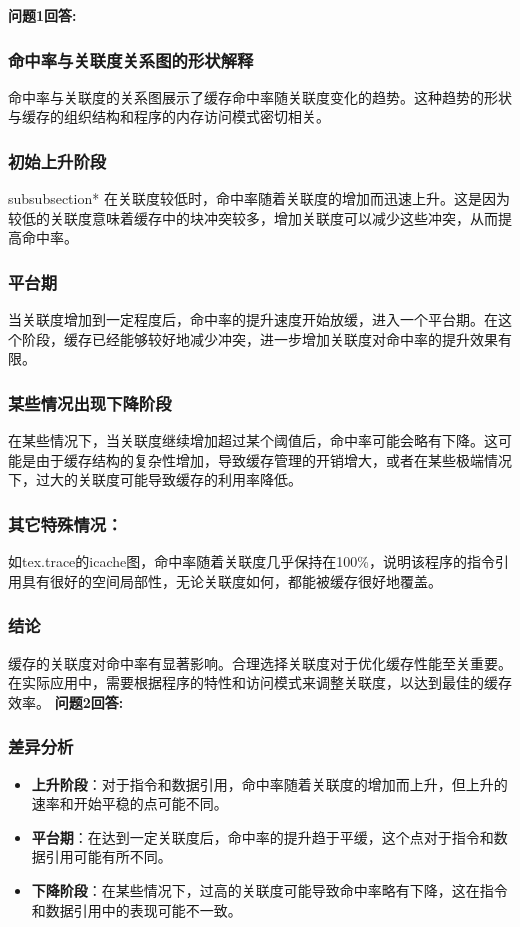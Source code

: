\documentclass[12pt,hyperref,a4paper,UTF8]{ctexart}
\begin{document}
\textbf{问题1回答:}



\subsubsection*{命中率与关联度关系图的形状解释}
命中率与关联度的关系图展示了缓存命中率随关联度变化的趋势。这种趋势的形状与缓存的组织结构和程序的内存访问模式密切相关。

\subsubsection*{初始上升阶段}subsubsection*
在关联度较低时，命中率随着关联度的增加而迅速上升。这是因为较低的关联度意味着缓存中的块冲突较多，增加关联度可以减少这些冲突，从而提高命中率。

\subsubsection*{平台期}
当关联度增加到一定程度后，命中率的提升速度开始放缓，进入一个平台期。在这个阶段，缓存已经能够较好地减少冲突，进一步增加关联度对命中率的提升效果有限。

\subsubsection*{某些情况出现下降阶段}
在某些情况下，当关联度继续增加超过某个阈值后，命中率可能会略有下降。这可能是由于缓存结构的复杂性增加，导致缓存管理的开销增大，或者在某些极端情况下，过大的关联度可能导致缓存的利用率降低。

\subsubsection*{其它特殊情况：}
如tex.trace的icache图，命中率随着关联度几乎保持在100\%，说明该程序的指令引用具有很好的空间局部性，无论关联度如何，都能被缓存很好地覆盖。

\subsubsection*{结论}
缓存的关联度对命中率有显著影响。合理选择关联度对于优化缓存性能至关重要。在实际应用中，需要根据程序的特性和访问模式来调整关联度，以达到最佳的缓存效率。
\newpage
\textbf{问题2回答:}

\subsubsection*{差异分析}
\begin{itemize}
  \item \textbf{上升阶段}：对于指令和数据引用，命中率随着关联度的增加而上升，但上升的速率和开始平稳的点可能不同。
  \item \textbf{平台期}：在达到一定关联度后，命中率的提升趋于平缓，这个点对于指令和数据引用可能有所不同。
  \item \textbf{下降阶段}：在某些情况下，过高的关联度可能导致命中率略有下降，这在指令和数据引用中的表现可能不一致。
\end{itemize}
\end{document}
